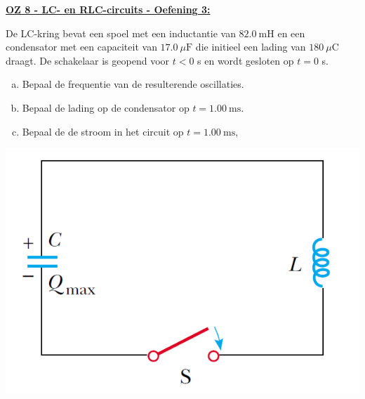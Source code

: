 \textbf{\underline{OZ 8 - LC- en  RLC-circuits - Oefening 3:}}
\vspace{0.5cm}

De LC-kring bevat een spoel met een inductantie van $82.0 \ \text{mH}$ en een condensator met een capaciteit van $17.0 \ \mu \text{F}$ die initieel een lading van $180 \ \mu \text{C}$ draagt. De schakelaar is geopend voor $t<0$ s en wordt gesloten op $t=0$ s.

\begin{minipage}{.66\textwidth}
    \vspace{-0.3cm}\begin{enumerate}[(a)]
        \item Bepaal de frequentie van de resulterende oscillaties.
        \item Bepaal de lading op de condensator op $t = 1.00 \ \text{ms}$.
        \item Bepaal de de stroom in het circuit op $t = 1.00 \ \text{ms}$,
    \end{enumerate}
\end{minipage}
\begin{minipage}{.3\textwidth}
    \includegraphics[scale = 0.275]{oz08/resources/Oz8Oef3.png}
\end{minipage}



